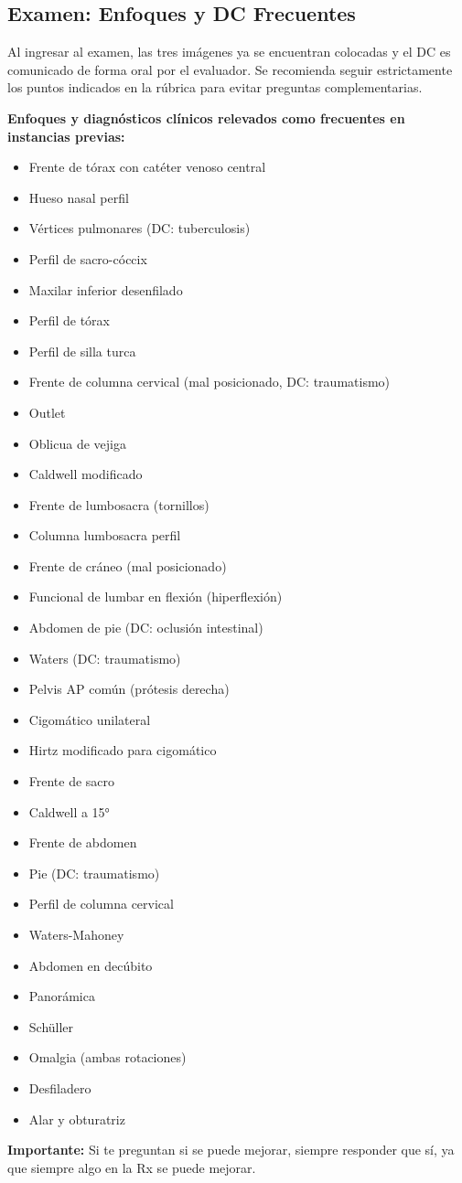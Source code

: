 	\subsection{Examen: Enfoques y DC Frecuentes}
	
	Al ingresar al examen, las tres imágenes ya se encuentran colocadas y el DC es comunicado de forma oral por el evaluador. Se recomienda seguir estrictamente los puntos indicados en la rúbrica para evitar preguntas complementarias.
	
	\textbf{Enfoques y diagnósticos clínicos relevados como frecuentes en instancias previas:}
	\begin{itemize}
		\item Frente de tórax con catéter venoso central
		\item Hueso nasal perfil
		\item Vértices pulmonares (DC: tuberculosis)
		\item Perfil de sacro-cóccix
		\item Maxilar inferior desenfilado
		\item Perfil de tórax
		\item Perfil de silla turca
		\item Frente de columna cervical (mal posicionado, DC: traumatismo)
		\item Outlet
		\item Oblicua de vejiga
		\item Caldwell modificado
		\item Frente de lumbosacra (tornillos)
		\item Columna lumbosacra perfil
		\item Frente de cráneo (mal posicionado)
		\item Funcional de lumbar en flexión (hiperflexión)
		\item Abdomen de pie (DC: oclusión intestinal)
		\item Waters (DC: traumatismo)
		\item Pelvis AP común (prótesis derecha)
		\item Cigomático unilateral
		\item Hirtz modificado para cigomático
		\item Frente de sacro
		\item Caldwell a 15°
		\item Frente de abdomen
		\item Pie (DC: traumatismo)
		\item Perfil de columna cervical
		\item Waters-Mahoney
		\item Abdomen en decúbito
		\item Panorámica
		\item Schüller
		\item Omalgia (ambas rotaciones)
		\item Desfiladero
		\item Alar y obturatriz
	\end{itemize}
	
	\textbf{Importante:} Si te preguntan si se puede mejorar, siempre responder que sí, ya que siempre algo en la Rx se puede mejorar.
	
\clearpage